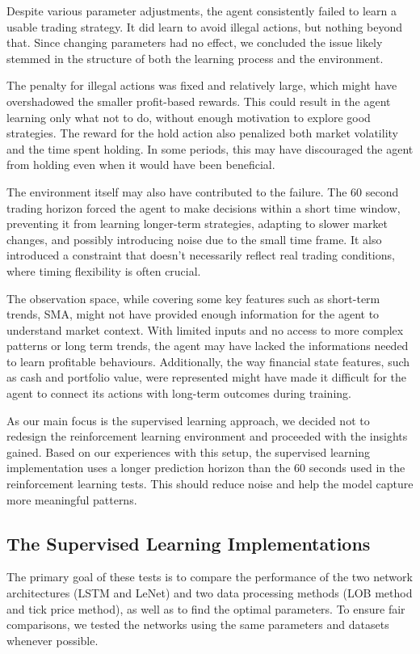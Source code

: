 \documentclass[a4paper,oneside,onecolumn,12pt]{book}
\begin{document}
	Despite various parameter adjustments, the agent consistently failed to learn a usable trading strategy. It did learn to avoid illegal actions, but nothing beyond that. Since changing parameters had no effect, we concluded the issue likely stemmed in the structure of both the learning process and the environment. 

	The penalty for illegal actions was fixed and relatively large, which might have overshadowed the smaller profit-based rewards. This could result in the agent learning only what not to do, without enough motivation to explore good strategies. The reward for the hold action also penalized both market volatility and the time spent holding. In some periods, this may have discouraged the agent from holding even when it would have been beneficial.
	
	The environment itself may also have contributed to the failure. The 60 second trading horizon forced the agent to make decisions within a short time window, preventing it from learning longer-term strategies, adapting to slower market changes, and possibly introducing noise due to the small time frame. It also introduced a constraint that doesn't necessarily reflect real trading conditions, where timing flexibility is often crucial.

	The observation space, while covering some key features such as short-term trends, SMA, might not have provided enough information for the agent to understand market context. With limited inputs and no access to more complex patterns or long term trends, the agent may have lacked the informations needed to learn profitable behaviours. Additionally, the way financial state features, such as cash and portfolio value, were represented might have made it difficult for the agent to connect its actions with long-term outcomes during training.
	
	As our main focus is the supervised learning approach, we decided not to redesign the reinforcement learning environment and proceeded with the insights gained. Based on our experiences with this setup, the supervised learning implementation uses a longer prediction horizon than the 60 seconds used in the reinforcement learning tests. This should reduce noise and help the model capture more meaningful patterns.

	\subsection{The Supervised Learning Implementations}
	The primary goal of these tests is to compare the performance of the two network architectures (LSTM and LeNet) and two data processing methods (LOB method and tick price method), as well as to find the optimal parameters. To ensure fair comparisons, we tested the networks using the same parameters and datasets whenever possible.
\end{document}
